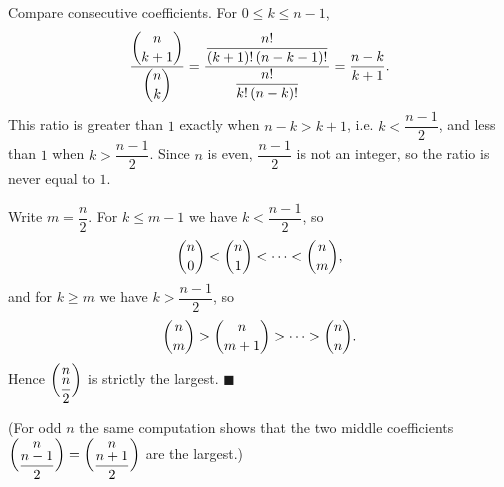 Compare consecutive coefficients. For $0\le k\le n-1$,
\[\dfrac{\dbinom{n}{k+1}}{\dbinom nk}=\dfrac{\dfrac{n!}{(k+1)!\,(n-k-1)!}}{\dfrac{n!}{k!\,(n-k)!}}=\dfrac{n-k}{k+1}.\]
This ratio is greater than $1$ exactly when $n-k>k+1$, i.e. $k<\dfrac{n-1}{2}$, and less than $1$ when $k>\dfrac{n-1}{2}$. Since $n$ is even, $\dfrac{n-1}{2}$ is not an integer, so the ratio is never equal to $1$.

Write $m=\dfrac {n}{2}$. For $k\le m-1$ we have $k<\dfrac{n-1}{2}$, so
\[\dbinom n0<\dbinom n1<\cdots<\dbinom nm,\]
and for $k\ge m$ we have $k>\dfrac{n-1}{2}$, so
\[\dbinom nm>\dbinom n{m+1}>\cdots>\dbinom nn.\]
Hence $\dbinom n{\dfrac {n}{2}}$ is strictly the largest. $\blacksquare$

(For odd $n$ the same computation shows that the two middle coefficients $\dbinom n{\dfrac{n-1}{2}}=\dbinom n{\dfrac{n+1}{2}}$ are the largest.)
